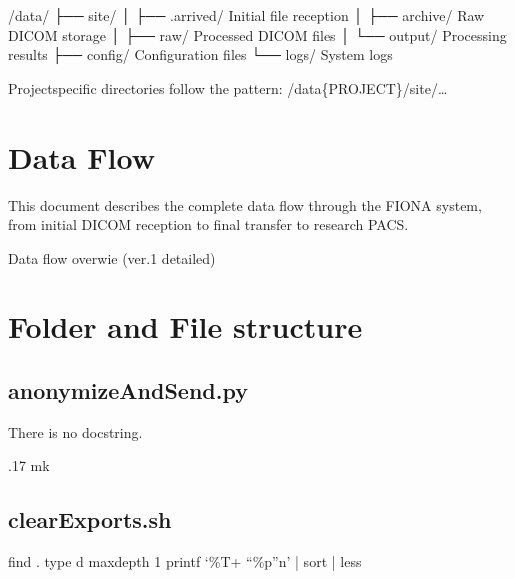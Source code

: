 \documentclass[letterpaper,10pt,english]{sphinxmanual}
\begin{document}
\begin{sphinxVerbatim}[commandchars=\\\{\}]
/data/
├── site/
│   ├── .arrived/          \PYGZsh{} Initial file reception
│   ├── archive/           \PYGZsh{} Raw DICOM storage
│   ├── raw/              \PYGZsh{} Processed DICOM files
│   └── output/           \PYGZsh{} Processing results
├── config/               \PYGZsh{} Configuration files
└── logs/                 \PYGZsh{} System logs
\end{sphinxVerbatim}

\sphinxAtStartPar
Project\sphinxhyphen{}specific directories follow the pattern:
/data\{PROJECT\}/site/…


\section{Data Flow}
\label{\detokenize{Architecture/index:data-flow}}
\sphinxAtStartPar
This document describes the complete data flow through the FIONA system, from initial DICOM reception to final transfer to research PACS.

\sphinxAtStartPar
Data flow overwie (ver.1 \sphinxhyphen{} detailed)



\section{Folder and File structure}
\label{\detokenize{Architecture/index:folder-and-file-structure}}


\sphinxstepscope


\subsection{anonymizeAndSend.py}
\label{\detokenize{Architecture/scripts/anonymizeAndSend:anonymizeandsend-py}}\label{\detokenize{Architecture/scripts/anonymizeAndSend::doc}}
\sphinxAtStartPar
There is no docstring.

.17 mk

\sphinxstepscope


\subsection{clearExports.sh}
\label{\detokenize{Architecture/scripts/clearExports:clearexports-sh}}\label{\detokenize{Architecture/scripts/clearExports::doc}}
\sphinxAtStartPar
find . \sphinxhyphen{}type d \sphinxhyphen{}maxdepth 1 \sphinxhyphen{}printf ‘\%T+ “\%p”n’ | sort | less
\end{document}
